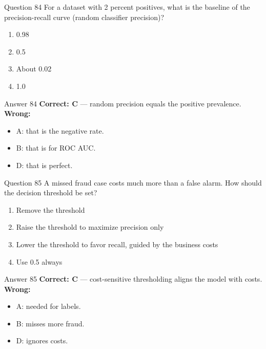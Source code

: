 \documentclass[aspectratio=169,11pt]{beamer}
\begin{document}
\begin{frame}{Question 84}
For a dataset with 2 percent positives, what is the baseline of the precision-recall curve (random classifier precision)?
\begin{enumerate}[label=\Alph*.]
\item 0.98
\item 0.5
\item About 0.02
\item 1.0
\end{enumerate}
\end{frame}
\begin{frame}{Answer 84}
\textbf{Correct: C} --- random precision equals the positive prevalence.\\
\vspace{0.5em}
\textbf{Wrong:}
\begin{itemize}
\item A: that is the negative rate.
\item B: that is for ROC AUC.
\item D: that is perfect.
\end{itemize}
\end{frame}

\begin{frame}{Question 85}
A missed fraud case costs much more than a false alarm. How should the decision threshold be set?
\begin{enumerate}[label=\Alph*.]
\item Remove the threshold
\item Raise the threshold to maximize precision only
\item Lower the threshold to favor recall, guided by the business costs
\item Use 0.5 always
\end{enumerate}
\end{frame}
\begin{frame}{Answer 85}
\textbf{Correct: C} --- cost-sensitive thresholding aligns the model with costs.\\
\vspace{0.5em}
\textbf{Wrong:}
\begin{itemize}
\item A: needed for labels.
\item B: misses more fraud.
\item D: ignores costs.
\end{itemize}
\end{frame}
\end{document}
